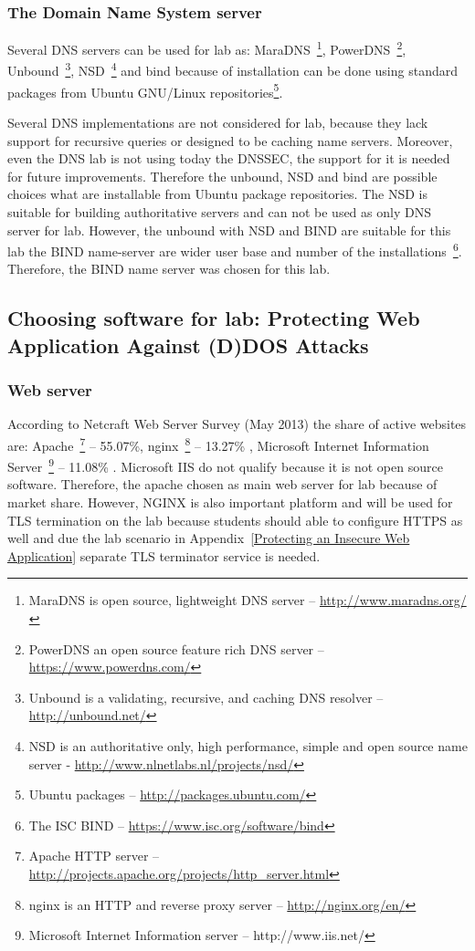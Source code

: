 \subsubsection{The Domain Name System server}
Several \gls{DNS} servers can be used for lab as: MaraDNS~\footnote{ MaraDNS is open source, lightweight \gls{DNS} server -- \url{http://www.maradns.org/}}, PowerDNS~\footnote{PowerDNS an open source feature rich \gls{DNS} server -- \url{https://www.powerdns.com/}}, Unbound~\footnote{Unbound is a validating, recursive, and caching \gls{DNS} resolver -- \url{http://unbound.net/}}, NSD~\footnote{NSD is an authoritative only, high performance, simple and open source name server - \url{http://www.nlnetlabs.nl/projects/nsd/}} and bind because of installation can be done using standard packages from Ubuntu GNU/Linux repositories\footnote{Ubuntu packages --  \url{http://packages.ubuntu.com/}}.

Several \gls{DNS} implementations are not considered for lab, because they lack support for recursive queries or designed to be caching name servers. Moreover, even the \gls{DNS} lab is not using today the \gls{DNSSEC}, the support for it is needed for future improvements. Therefore the unbound, NSD and bind are possible choices what are installable from Ubuntu package repositories. The NSD is suitable for building authoritative servers and can not be used as only \gls{DNS} server for lab.
However, the unbound with NSD and BIND are suitable for this lab the BIND name-server are wider user base and number of the installations~\footnote{The \gls{ISC} BIND -- \url{https://www.isc.org/software/bind}}. Therefore, the BIND name server was chosen for this lab.


\subsection{Choosing software for lab: Protecting Web Application Against (D)DOS Attacks}

\subsubsection{Web server}
According to Netcraft Web Server Survey (May 2013) the share of active websites are: Apache~\footnote{Apache \gls{HTTP} server -- \url{http://projects.apache.org/projects/http_server.html}} -- 55.07\%,  nginx~\footnote{nginx is an HTTP and reverse proxy server -- \url{http://nginx.org/en/}} -- 13.27\%	, Microsoft Internet Information Server~\footnote{Microsoft Internet Information server -- http://www.iis.net/} -- 11.08\% \citep{website:netcraft_web}. Microsoft IIS do not qualify because it is not open source software. Therefore, the apache chosen as main web server for lab because of market share. However, NGINX is also important platform and will be used for \gls{TLS} termination on the lab because students should able to configure \gls{HTTPS} as well and due the lab scenario in Appendix~\ref{Protecting an Insecure Web Application} separate \gls{TLS} terminator service is needed.

